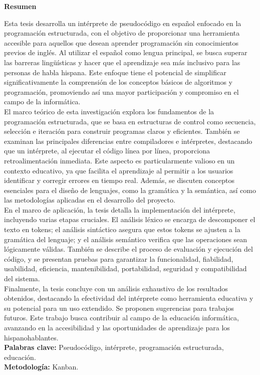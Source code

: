 \begin{spacing}{1.5}
  \begin{center}
    \Large \textbf{Resumen}
  \end{center}
  Esta tesis desarrolla un intérprete de pseudocódigo en español enfocado en la programación estructurada, con el objetivo de proporcionar una herramienta accesible para aquellos que desean aprender programación sin conocimientos previos de inglés. Al utilizar el español como lengua principal, se busca superar las barreras lingüísticas y hacer que el aprendizaje sea más inclusivo para las personas de habla hispana. Este enfoque tiene el potencial de simplificar significativamente la comprensión de los conceptos básicos de algoritmos y programación, promoviendo así una mayor participación y compromiso en el campo de la informática. \\
  El marco teórico de esta investigación explora los fundamentos de la programación estructurada, que se basa en estructuras de control como secuencia, selección e iteración para construir programas claros y eficientes. También se examinan las principales diferencias entre compiladores e intérpretes, destacando que un intérprete, al ejecutar el código línea por línea, proporciona retroalimentación inmediata. Este aspecto es particularmente valioso en un contexto educativo, ya que facilita el aprendizaje al permitir a los usuarios identificar y corregir errores en tiempo real. Además, se discuten conceptos esenciales para el diseño de lenguajes, como la gramática y la semántica, así como las metodologías aplicadas en el desarrollo del proyecto. \\  
  En el marco de aplicación, la tesis detalla la implementación del intérprete, incluyendo varias etapas cruciales. El análisis léxico se encarga de descomponer el texto en tokens; el análisis sintáctico asegura que estos tokens se ajusten a la gramática del lenguaje; y el análisis semántico verifica que las operaciones sean lógicamente válidas. También se describe el proceso de evaluación y ejecución del código, y se presentan pruebas para garantizar la funcionalidad, fiabilidad, usabilidad, eficiencia, mantenibilidad, portabilidad, seguridad y compatibilidad del sistema. \\  
  Finalmente, la tesis concluye con un análisis exhaustivo de los resultados obtenidos, destacando la efectividad del intérprete como herramienta educativa y su potencial para un uso extendido. Se proponen sugerencias para trabajos futuros. Este trabajo busca contribuir al campo de la educación informática, avanzando en la accesibilidad y las oportunidades de aprendizaje para los hispanohablantes. \\
  \textbf{Palabras clave:} Pseudocódigo, intérprete, programación estructurada, educación. \\
  \textbf{Metodología:} Kanban.
\end{spacing}
